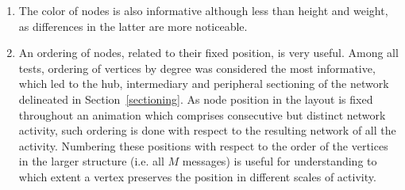 \begin{enumerate}
																																																																																																																																																																																																																																																																																																																																																																																																										\item The color of nodes is also informative although less than height and weight, as differences in the latter are more noticeable.
																																																																																																																																																																																																																																																																																																																																																																																																											\item An ordering of nodes, related to their fixed position, is very useful. Among all tests, ordering of vertices by degree was considered the most informative, which led to the hub, intermediary and peripheral sectioning of the network delineated in Section~\ref{sectioning}.
																																																																																																																																																																																																																																																																																																																																																																																																													As node position in the layout is fixed throughout an animation which comprises consecutive but distinct network activity, such ordering is done with respect to the resulting network of all the activity.
																																																																																																																																																																																																																																																																																																																																																																																																															Numbering these positions with respect to the order of the vertices in the larger structure (i.e. all $M$ messages) is useful for understanding to which extent a vertex preserves the position in different scales of activity.
																																																																																																																																																																																																																																																																																																																																																																																																															\end{enumerate}
